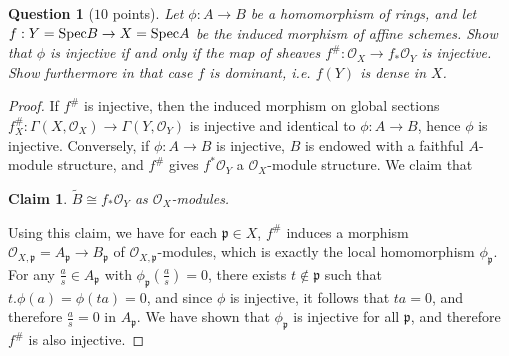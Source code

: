 \documentclass[12pt]{amsart}
\newtheorem{question}{Question}
\newtheorem{clm}{Claim}
\begin{document}
\begin{question}[$10$ points]
Let $\phi: A \to B$ be a homomorphism of rings, and let $f: Y ={\rm Spec} B \to X={\rm Spec} A$ be the induced morphism of affine schemes. Show that $\phi$ is injective if and only if the map of sheaves $f^\#: \mathcal O_X \to f_*\mathcal O_Y$ is injective. Show furthermore in that case $f$ is dominant, i.e. $f(Y)$ is dense in $X$.

\end{question}

\begin{proof}
	If $f^{\# } $ is injective, then the induced morphism on global sections $f^{\# }_X\colon\Gamma (X,\mathcal{O}_X )\to\Gamma (Y,\mathcal{O}_Y )$ is injective and identical to $\phi\colon A\to B$, hence $\phi $ is injective. Conversely, if $\phi\colon A\to B$ is injective, $B$ is endowed with a faithful $A$-module structure, and $f^{\# } $ gives $f^{\ast }\mathcal{O}_Y $ a $\mathcal{O}_X $-module structure. We claim that
	\begin{clm}\label{equivalence-between-ring-and-module}
		$\tilde{B}\cong f_{\ast }\mathcal{O}_Y $ as $\mathcal{O}_X $-modules.
	\end{clm}
	Using this claim, we have for each $\mathfrak{p}\in X$, $f^{\# } $ induces a morphism $\mathcal{O}_{X,\mathfrak{p} } =A_{\mathfrak{p} }\to B_{\mathfrak{p} } $ of $\mathcal{O}_{X,\mathfrak{p} } $-modules, which is exactly the local homomorphism $\phi_{\mathfrak{p} } $. For any $\frac{a}{s}\in A_{\mathfrak{p} } $ with $\phi_{\mathfrak{p} } (\frac{a}{s} )=0$, there exists $t\not\in\mathfrak{p} $ such that $t.\phi (a)=\phi (ta)=0$, and since $\phi $ is injective, it follows that $ta=0$, and therefore $\frac{a}{s} =0$ in $A_{\mathfrak{p} } $. We have shown that $\phi_{\mathfrak{p} } $ is injective for all $\mathfrak{p} $, and therefore $f^{\# } $ is also injective.
\end{proof}
\end{document}
